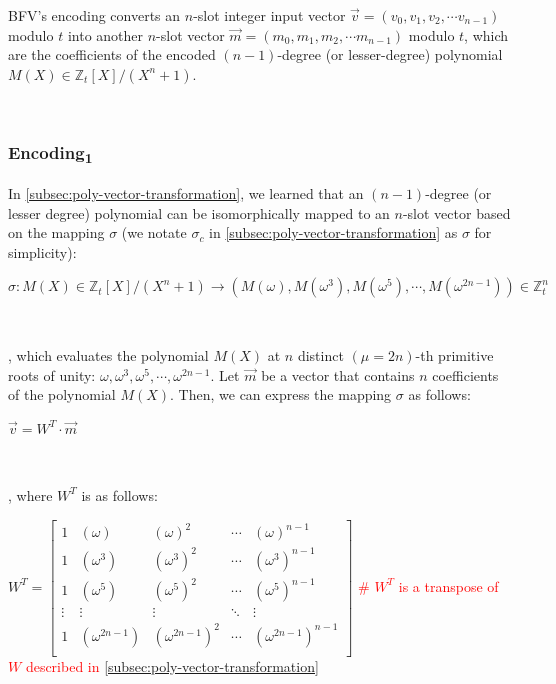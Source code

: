 BFV's encoding converts an $n$-slot integer input vector $\vec{v} = (v_0, v_1, v_2, \cdots v_{n-1})$ modulo $t$ into another $n$-slot vector $\vec{m} = (m_0, m_1, m_2, \cdots m_{n-1})$ modulo $t$, which are the coefficients of the encoded $(n-1)$-degree (or lesser-degree) polynomial $M(X) \in \mathbb{Z}_t[X] / (X^n + 1)$. 

$ $

\subsubsection{\textsf{Encoding\textsubscript{1}}}  
\label{subsubsec:bfv-encoding-1} 

In \autoref{subsec:poly-vector-transformation}, we learned that an $(n-1)$-degree (or lesser degree) polynomial can be isomorphically mapped to an $n$-slot vector based on the mapping $\sigma$ (we notate $\sigma_c$ in \autoref{subsec:poly-vector-transformation} as $\sigma$ for simplicity): 

$\sigma: M(X) \in \mathbb{Z}_t[X]/(X^n + 1) \longrightarrow  (M(\omega),M(\omega^3),M(\omega^5), \cdots, M(\omega^{2n-1})) \in \mathbb{Z}_t^n$

$ $

, which evaluates the polynomial $M(X)$ at $n$ distinct $(\mu=2n)$-th primitive roots of unity: $\omega, \omega^3, \omega^5, \cdots, \omega^{2n-1}$. Let $\vec{m}$ be a vector that contains $n$ coefficients of the polynomial $M(X)$. Then, we can express the mapping $\sigma$ as follows: 

$\vec{v} = W^T \cdot \vec{m}$

$ $

, where $W^T$ is as follows: 

$W^T = \begin{bmatrix}
1 & (\omega) & (\omega)^2 & \cdots & (\omega)^{n-1}\\
1 & (\omega^3) & (\omega^3)^2 & \cdots & (\omega^3)^{n-1}\\
1 & (\omega^5) & (\omega^5)^2 & \cdots & (\omega^5)^{n-1}\\
\vdots & \vdots & \vdots & \ddots & \vdots \\
1 & (\omega^{2n-1}) & (\omega^{2n-1})^2 & \cdots & (\omega^{2n-1})^{n-1}\\
\end{bmatrix}$  \textcolor{red}{ \text{ } \# $W^T$ is a transpose of $W$ described in \autoref{subsec:poly-vector-transformation}}

$ $


